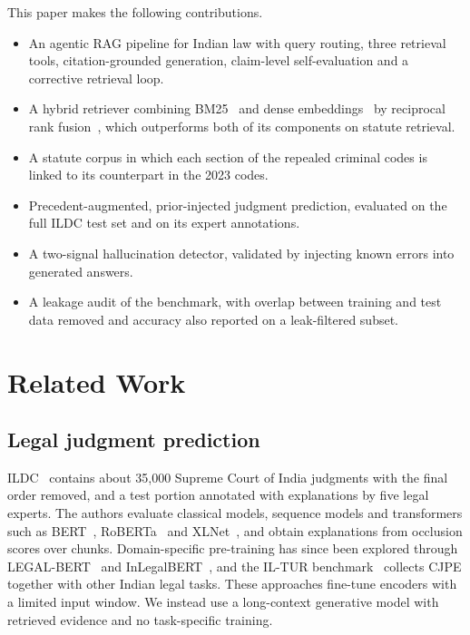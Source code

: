 \documentclass[conference]{IEEEtran}
\begin{document}
This paper makes the following contributions.
\begin{itemize}
\item An agentic RAG pipeline for Indian law with query routing, three retrieval tools, citation-grounded generation, claim-level self-evaluation and a corrective retrieval loop.
\item A hybrid retriever combining BM25~\cite{robertson2009} and dense embeddings~\cite{xiao2023} by reciprocal rank fusion~\cite{cormack2009}, which outperforms both of its components on statute retrieval.
\item A statute corpus in which each section of the repealed criminal codes is linked to its counterpart in the 2023 codes.
\item Precedent-augmented, prior-injected judgment prediction, evaluated on the full ILDC test set and on its expert annotations.
\item A two-signal hallucination detector, validated by injecting known errors into generated answers.
\item A leakage audit of the benchmark, with overlap between training and test data removed and accuracy also reported on a leak-filtered subset.
\end{itemize}

\section{Related Work}
\subsection{Legal judgment prediction}
ILDC~\cite{malik2021} contains about 35,000 Supreme Court of India judgments with the final order removed, and a test portion annotated with explanations by five legal experts. The authors evaluate classical models, sequence models and transformers such as BERT~\cite{devlin2019}, RoBERTa~\cite{liu2019} and XLNet~\cite{yang2019}, and obtain explanations from occlusion scores over chunks. Domain-specific pre-training has since been explored through LEGAL-BERT~\cite{chalkidis2020} and InLegalBERT~\cite{paul2023}, and the IL-TUR benchmark~\cite{joshi2024} collects CJPE together with other Indian legal tasks. These approaches fine-tune encoders with a limited input window. We instead use a long-context generative model with retrieved evidence and no task-specific training.
\end{document}
